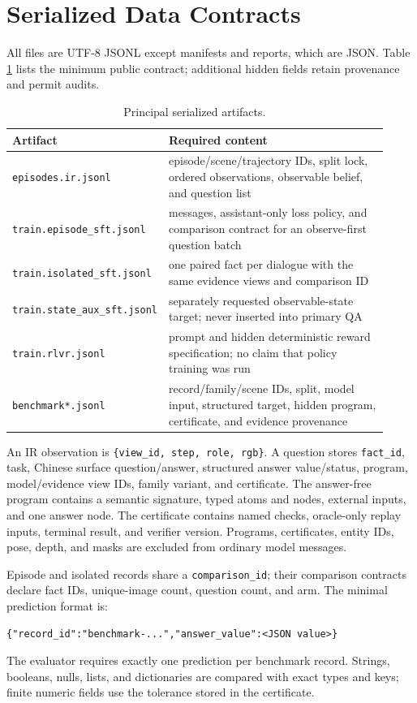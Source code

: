 \section{Serialized Data Contracts}
\label{app:schemas}

All files are UTF-8 JSONL except manifests and reports, which are JSON.  Table
\ref{tab:schemas} lists the minimum public contract; additional hidden fields
retain provenance and permit audits.

\begin{table}[h]
\centering
\small
\caption{Principal serialized artifacts.}
\label{tab:schemas}
\begin{tabular}{p{0.28\linewidth}p{0.64\linewidth}}
\toprule
Artifact & Required content \\
\midrule
\texttt{episodes.ir.jsonl} & episode/scene/trajectory IDs, split lock, ordered
observations, observable belief, and question list \\
\texttt{train.episode\_sft.jsonl} & messages, assistant-only loss policy, and
comparison contract for an observe-first question batch \\
\texttt{train.isolated\_sft.jsonl} & one paired fact per dialogue with the
same evidence views and comparison ID \\
\texttt{train.state\_aux\_sft.jsonl} & separately requested observable-state
target; never inserted into primary QA \\
\texttt{train.rlvr.jsonl} & prompt and hidden deterministic reward specification;
no claim that policy training was run \\
\texttt{benchmark*.jsonl} & record/family/scene IDs, split, model input,
structured target, hidden program, certificate, and evidence provenance \\
\bottomrule
\end{tabular}
\end{table}

An IR observation is
\texttt{\{view\_id, step, role, rgb\}}.  A question stores
\texttt{fact\_id}, task, Chinese surface question/answer, structured answer
value/status, program, model/evidence view IDs, family variant, and certificate.
The answer-free program contains a semantic signature, typed atoms and nodes,
external inputs, and one answer node.  The certificate contains named checks,
oracle-only replay inputs, terminal result, and verifier version.  Programs,
certificates, entity IDs, pose, depth, and masks are excluded from ordinary
model messages.

Episode and isolated records share a \texttt{comparison\_id}; their comparison
contracts declare fact IDs, unique-image count, question count, and arm.  The
minimal prediction format is:
\begin{verbatim}
{"record_id":"benchmark-...","answer_value":<JSON value>}
\end{verbatim}
The evaluator requires exactly one prediction per benchmark record.  Strings,
booleans, nulls, lists, and dictionaries are compared with exact types and
keys; finite numeric fields use the tolerance stored in the certificate.

